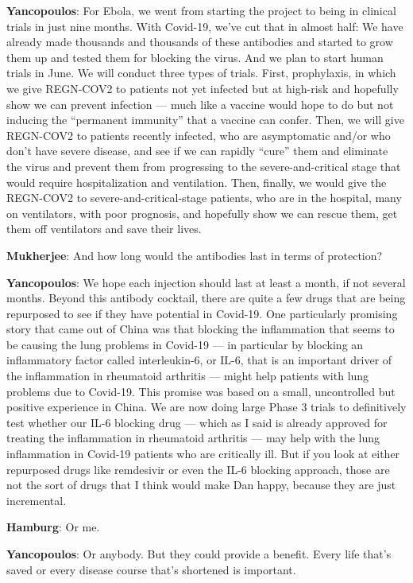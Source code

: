 \textbf{Yancopoulos}: For Ebola, we went from starting the project to
being in clinical trials in just nine months. With Covid-19, we've cut
that in almost half: We have already made thousands and thousands of
these antibodies and started to grow them up and tested them for
blocking the virus. And we plan to start human trials in June. We will
conduct three types of trials. First, prophylaxis, in which we give
REGN-COV2 to patients not yet infected but at high-risk and hopefully
show we can prevent infection --- much like a vaccine would hope to do
but not inducing the ``permanent immunity'' that a vaccine can confer.
Then, we will give REGN-COV2 to patients recently infected, who are
asymptomatic and/or who don't have severe disease, and see if we can
rapidly ``cure'' them and eliminate the virus and prevent them from
progressing to the severe-and-critical stage that would require
hospitalization and ventilation. Then, finally, we would give the
REGN-COV2 to severe-and-critical-stage patients, who are in the
hospital, many on ventilators, with poor prognosis, and hopefully show
we can rescue them, get them off ventilators and save their lives.

\textbf{Mukherjee}: And how long would the antibodies last in terms of
protection?

\textbf{Yancopoulos}: We hope each injection should last at least a
month, if not several months. Beyond this antibody cocktail, there are
quite a few drugs that are being repurposed to see if they have
potential in Covid-19. One particularly promising story that came out of
China was that blocking the inflammation that seems to be causing the
lung problems in Covid-19 --- in particular by blocking an inflammatory
factor called interleukin-6, or IL-6, that is an important driver of the
inflammation in rheumatoid arthritis --- might help patients with lung
problems due to Covid-19. This promise was based on a small,
uncontrolled but positive experience in China. We are now doing large
Phase 3 trials to definitively test whether our IL-6 blocking drug ---
which as I said is already approved for treating the inflammation in
rheumatoid arthritis --- may help with the lung inflammation in Covid-19
patients who are critically ill. But if you look at either repurposed
drugs like remdesivir or even the IL-6 blocking approach, those are not
the sort of drugs that I think would make Dan happy, because they are
just incremental.

\textbf{Hamburg}: Or me.

\textbf{Yancopoulos}: Or anybody. But they could provide a benefit.
Every life that's saved or every disease course that's shortened is
important.

